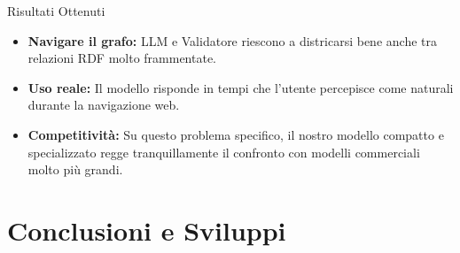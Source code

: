 \documentclass[10pt,aspectratio=169]{beamer}
\begin{document}
\begin{frame}{Risultati Ottenuti}
    \begin{center}
    \end{center}
    
    \vspace{0.5cm}
    \begin{itemize}
        \item \textbf{Navigare il grafo:} LLM e Validatore riescono a districarsi bene anche tra relazioni RDF molto frammentate.
        \item \textbf{Uso reale:} Il modello risponde in tempi che l'utente percepisce come naturali durante la navigazione web.
        \item \textbf{Competitività:} Su questo problema specifico, il nostro modello compatto e specializzato regge tranquillamente il confronto con modelli commerciali molto più grandi.
    \end{itemize}
\end{frame}

\section{Conclusioni e Sviluppi}
\end{document}
